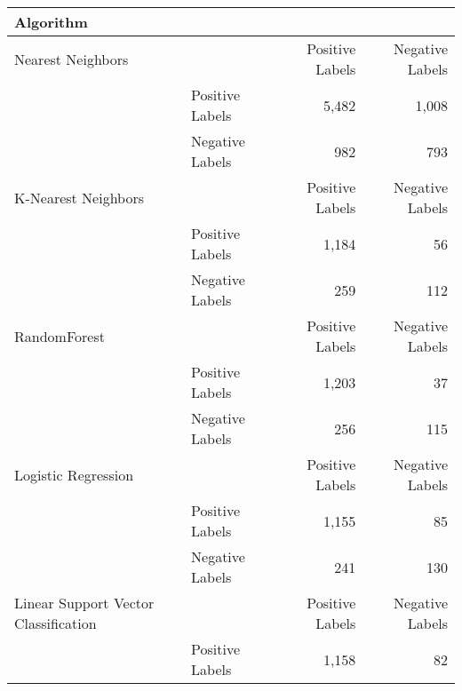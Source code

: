 \begin{tabular}{llrr}
    \toprule
    \textbf{Algorithm}                  &                           &                           &                           \\
    \midrule
    Nearest Neighbors                   &                           & Positive Labels           & Negative Labels            \\
                                        & Positive Labels           & 5,482                     & 1,008                      \\
                                        & Negative Labels           & 982                       & 793                        \\
    \midrule
    K-Nearest Neighbors                 &                           & Positive Labels           & Negative Labels            \\
                                        & Positive Labels           & 1,184                     & 56                         \\
                                        & Negative Labels           & 259                       & 112                        \\
    \midrule
    RandomForest                        &                           & Positive Labels           & Negative Labels            \\
                                        & Positive Labels           & 1,203                     & 37                         \\
                                        & Negative Labels           & 256                       & 115                        \\
    \midrule
    Logistic Regression                 &                           & Positive Labels           & Negative Labels            \\
                                        & Positive Labels           & 1,155                     & 85                         \\
                                        & Negative Labels           & 241                       & 130                        \\
    \midrule
    Linear Support Vector Classification&                           & Positive Labels           & Negative Labels           \\
                                        & Positive Labels           & 1,158                     & 82                        \\

\end{tabular}
